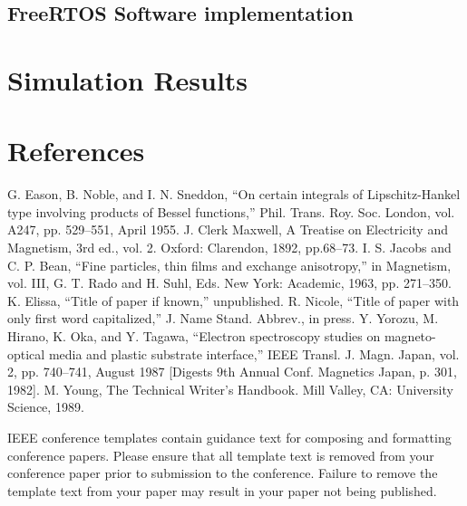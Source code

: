 \documentclass[conference]{IEEEtran}
\begin{document}
\subsection{FreeRTOS Software implementation}


\section{Simulation Results}


\section*{References}



\begin{thebibliography}{00}
 G. Eason, B. Noble, and I. N. Sneddon, ``On certain integrals of Lipschitz-Hankel type involving products of Bessel functions,'' Phil. Trans. Roy. Soc. London, vol. A247, pp. 529--551, April 1955.
 J. Clerk Maxwell, A Treatise on Electricity and Magnetism, 3rd ed., vol. 2. Oxford: Clarendon, 1892, pp.68--73.
 I. S. Jacobs and C. P. Bean, ``Fine particles, thin films and exchange anisotropy,'' in Magnetism, vol. III, G. T. Rado and H. Suhl, Eds. New York: Academic, 1963, pp. 271--350.
 K. Elissa, ``Title of paper if known,'' unpublished.
 R. Nicole, ``Title of paper with only first word capitalized,'' J. Name Stand. Abbrev., in press.
 Y. Yorozu, M. Hirano, K. Oka, and Y. Tagawa, ``Electron spectroscopy studies on magneto-optical media and plastic substrate interface,'' IEEE Transl. J. Magn. Japan, vol. 2, pp. 740--741, August 1987 [Digests 9th Annual Conf. Magnetics Japan, p. 301, 1982].
 M. Young, The Technical Writer's Handbook. Mill Valley, CA: University Science, 1989.
\end{thebibliography}
\vspace{12pt}
\color{red}
IEEE conference templates contain guidance text for composing and formatting conference papers. Please ensure that all template text is removed from your conference paper prior to submission to the conference. Failure to remove the template text from your paper may result in your paper not being published.
\end{document}
